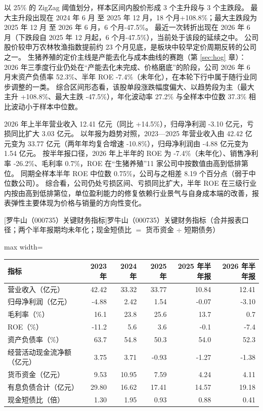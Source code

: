  以 25\% 的 ZigZag 阈值划分，样本区间内股价形成 3 个主升段与 3 个主跌段。 最大主升段出现在 2024 年 6 月 至 2025 年 12 月，18 个月+108.8\%；最大主跌段为 2025 年 12 月 至 2026 年 6 月，6 个月-47.5\%。 最近一次转折出现在 2026 年 6 月（下跌段自 2025 年 12 月起，6 个月-47.5\%），当前处于该段的延续之中。 公司股价较申万农林牧渔指数提前约 23 个月见底，是板块中较早定价周期反转的公司之一。 生猪养殖的定价主线是产能去化与成本曲线的赛跑（第 \ref{sec:hog} 章）：2026 年三季度行业仍处在“产能去化未完成、价格磨底”的阶段，公司 2026 年 6 月末资产负债率 52.3\%、半年 ROE -7.4\%（未年化），在本轮下行中属于随行业同步调整的一类。 综合区间形态看，该股单段涨跌幅度偏大、以趋势段为主（最大主升 +108.8\%、最大主跌 -47.5\%），年化波动率 27.2\% 与全样本中位数 37.3\% 相比波动小于样本中位数。

 2026 年上半年营业收入 12.41 亿元（同比 +14.5\%），归母净利润 -3.10 亿元，亏损同比扩大 3.03 亿元。 以年报为趋势对照，2023---2025 年营业收入由 42.42 亿元变为 33.77 亿元（两年年均复合增速 -10.8\%），归母净利润由 -4.88 亿元变为 1.54 亿元。 按半年报口径，2026 年上半年的 ROE 为 -7.4\%（未年化）、销售净利率 -26.2\%、毛利率 0.7\%，ROE 在“生猪养殖”11 家公司中按数值由高到低排第位。 同期全样本半年 ROE 中位数 0.75\%，公司与之相差 8.19 个百分点（弱于中位数公司）。 综合看，公司仍处亏损区间、亏损同比扩大，半年 ROE 在三级行业内按由高到低排第位，单位盈利能力的修复依赖行业景气与自身成本端的改善，报表弹性主要体现为价格与销量的方向性变化。

\begin{center}\small\setlength{\tabcolsep}{3.4pt}
[罗牛山（000735）关键财务指标]{罗牛山（000735）关键财务指标（合并报表口径；两个半年报期均未年化；现金短债比 $=$ 货币资金 $\div$ 短期债务）}
\begin{adjustbox}{max width=\textwidth}
\begin{tabular}{@{}lrrrrr@{}}
\toprule
指标 & 2023 年 & 2024 年 & 2025 年 & 2025 年半年报 & 2026 年半年报 \\
\midrule
营业收入（亿元） & 42.42 & 33.32 & 33.77 & 10.84 & 12.41 \\
归母净利润（亿元） & -4.88 & 2.42 & 1.54 & -0.07 & -3.10 \\
毛利率（\%） & 16.1 & 23.8 & 25.6 & 13.7 & 0.7 \\
ROE（\%） & -11.2 & 5.6 & 3.6 & -0.1 & -7.4 \\
资产负债率（\%） & 63.7 & 54.8 & 50.3 & 54.0 & 52.3 \\
经营活动现金流净额（亿元） & 3.75 & 3.71 & -0.93 & -1.27 & -1.38 \\
货币资金（亿元） & 9.53 & 10.95 & 7.59 & 4.24 & 4.11 \\
有息负债合计（亿元） & 29.80 & 16.62 & 17.41 & 14.57 & 19.18 \\
现金短债比（倍） & 1.30 & 1.95 & 0.93 & 0.88 & 0.41 \\
\bottomrule
\end{tabular}
\end{adjustbox}
\end{center}

